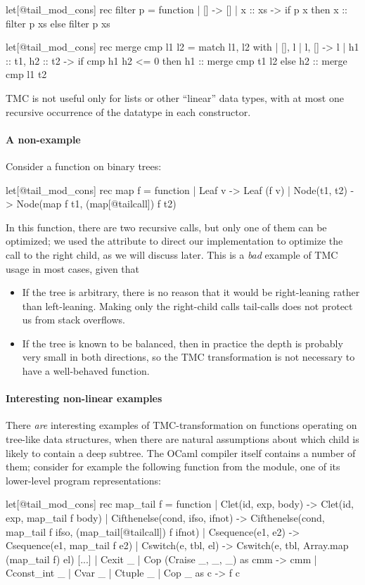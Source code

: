 \begin{Ocaml}
let[@tail_mod_cons] rec filter p = function
| [] -> []
| x :: xs -> if p x then x :: filter p xs else filter p xs

let[@tail_mod_cons] rec merge cmp l1 l2 =
  match l1, l2 with
  | [], l | l, [] -> l
  | h1 :: t1, h2 :: t2 ->
      if cmp h1 h2 <= 0
      then h1 :: merge cmp t1 l2
      else h2 :: merge cmp l1 t2
\end{Ocaml}

TMC is not useful only for lists or other ``linear'' data types, with
at most one recursive occurrence of the datatype in each
constructor.

\paragraph{A non-example} Consider a  function on binary
trees:
\begin{Ocaml}
let[@tail_mod_cons] rec map f = function
| Leaf v -> Leaf (f v)
| Node(t1, t2) -> Node(map f t1, (map[@tailcall]) f t2)
\end{Ocaml}
In this function, there are two recursive calls, but only one of them
can be optimized; we used the \ocaml{[@tailcall]} attribute to direct
our implementation to optimize the call to the right child, as we will
discuss later. This is a \emph{bad} example of TMC usage in most
cases, given that
\begin{itemize}
\item If the tree is arbitrary, there is no reason that it would be
  right-leaning rather than left-leaning. Making only the right-child
  calls tail-calls does not protect us from stack overflows.
\item If the tree is known to be balanced, then in practice the depth
  is probably very small in both directions, so the TMC transformation
  is not necessary to have a well-behaved function.
\end{itemize}

\paragraph{Interesting non-linear examples} There \emph{are} interesting
examples of TMC-transformation on functions operating on tree-like
data structures, when there are natural assumptions about which child
is likely to contain a deep subtree. The OCaml compiler itself
contains a number of them; consider for example the following function
from the  module, one of its lower-level program
representations:
\begin{Ocaml}
let[@tail_mod_cons] rec map_tail f = function
  | Clet(id, exp, body) ->
      Clet(id, exp, map_tail f body)
  | Cifthenelse(cond, ifso, ifnot) ->
      Cifthenelse(cond, map_tail f ifso, (map_tail[@tailcall]) f ifnot)
  | Csequence(e1, e2) ->
      Csequence(e1, map_tail f e2)
  | Cswitch(e, tbl, el) ->
      Cswitch(e, tbl, Array.map (map_tail f) el)
  [...]
  | Cexit _ | Cop (Craise _, _, _) as cmm ->
      cmm
  | Cconst_int _ | Cvar _ | Ctuple _ | Cop _ as c ->
      f c
\end{Ocaml}

